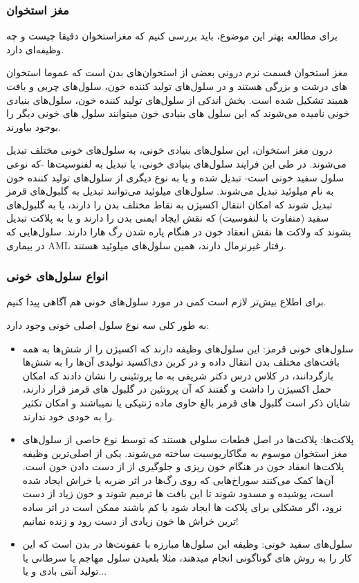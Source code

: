 \documentclass[12pt]{article}
\begin{document}
\subsubsection{مغز استخوان}

برای مطالعه بهتر این موضوع، باید بررسی کنیم که مغزاستخوان دقیقا چیست و چه وظیفه‌ای دارد.

مغز استخوان قسمت نرم درونی بعضی از استخوان‌های بدن است که عموما استخوان های درشت و بزرگی هستند و در سلول‌های تولید کننده خون، سلول‌های چربی و بافت همبند تشکیل شده است. بخش اندکی از سلول‌های تولید کننده خون، سلول‌های بنیادی خونی
 نامیده می‌شوند که این سلول های بنیادی خون میتوانند سلول های خونی دیگر را بوجود بیاورند.

درون مغز استخوان، این سلول‌های بنیادی خونی، به سلول‌های خونی مختلف تبدیل می‌شوند.  در طی این فرايند سلول‌های بنیادی خونی، یا تبدیل به لفنوسیت‌ها -که نوعی سلول سفید خونی است- تبدیل شده و یا به نوع دیگری از سلول‌های تولید کننده خون به نام میلوئید تبدیل می‌شوند. سلول‌های میلوئید می‌توانند تبدیل به گلبول‌های قرمز تبدیل شوند که امکان انتقال اکسیژن به نقاط مختلف بدن را دارند، یا به گلبول‌های سفید (متفاوت با لنفوسیت) که نقش ایجاد ایمنی بدن را دارند و یا به پلاکت تبدیل بشوند که ولاکت ها نقش انعقاد خون در هنگام پاره شدن رگ هارا دارند.  سلول‌هایی که در بیماری AML رفتار غیرنرمال دارند، همین سلول‌های میلوئید هستند.

\subsubsection{انواع سلول‌های خونی}

برای اطلاع بیش‌تر لازم است کمی در مورد سلول‌های خونی هم آگاهی پیدا کنیم.

به طور کلی سه نوع سلول اصلی خونی وجود دارد:

\begin{itemize}
	\item 
	 سلول‌های خونی قرمز: این سلول‌های وظیفه دارند که اکسیژن را از شش‌ها به همه بافت‌های مختلف بدن انتقال داده و در کربن دی‌اکسید تولیدی آن‌ها را به شش‌ها بازگردانند، در کلاس درس دکتر شریفی به ما پروتئینی را نشان دادند که امکان حمل اکسیژن را داشت و گفتند که آن پروتئین در گلبول های قرمز قرار دارند، شایان ذکر است گلبول های قرمز بالغ حاوی ماده ژنتیکی یا 
	 نمیباشند و امکان تکثیر را به خودی خود ندارند.
	
	\item پلاکت‌ها: پلاکت‌ها در اصل قطعات سلولی هستند که توسط نوع خاصی از سلول‌های مغز استخوان موسوم به مگاکاریوسیت 
	ساخته می‌شوند. یکی از اصلی‌ترین وظیفه پلاکت‌ها انعقاد خون در هنگام خون ریزی و جلوگیری از از دست دادن خون است. آن‌ها کمک می‌کنند سوراخ‌هایی که روی رگ‌ها در اثر ضربه یا خراش ایجاد شده است، پوشیده و مسدود شوند تا این بافت ها ترمیم شوند و خون زیاد از دست نرود، اگر مشکلی برای پلاکت ها ایجاد شود یا کم باشند ممکن است در اثر ساده ترین خراش ها خون زیادی از دست رود و زنده نمانیم!
	
	\item 
سلول‌های سفید خونی: وظیفه این سلول‌ها مبارزه با عفونت‌ها در بدن است که این کار را به روش های گوناگونی انجام میدهند، مثلا بلعیدن سلول مهاجم یا سرطانی یا تولید آنتی بادی و یا...
\end{itemize}
\end{document}
